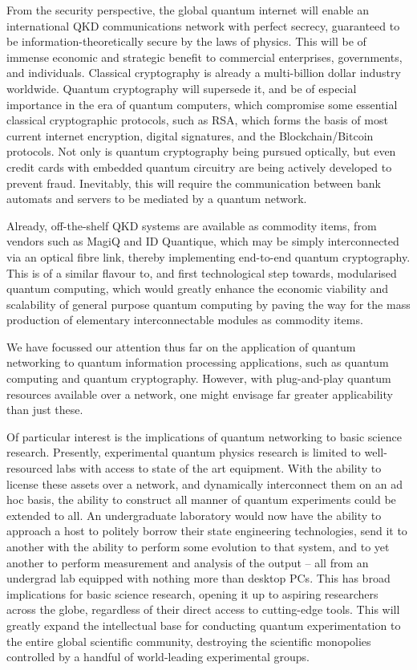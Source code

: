 \documentclass[aps, rmp, twocolumn, amsmath, amssymb, nofootinbib, superscriptaddress, longbibliography, floatfix, table-of-contents, eqsecnum]{revtex4-1}
\begin{document}
From the security perspective, the global quantum internet will enable an international QKD communications network with perfect secrecy, guaranteed to be information-theoretically secure by the laws of physics. This will be of immense economic and strategic benefit to commercial enterprises, governments, and individuals. Classical cryptography is already a multi-billion dollar industry worldwide. Quantum cryptography will supersede it, and be of especial importance in the era of quantum computers, which compromise some essential classical cryptographic protocols, such as RSA, which forms the basis of most current internet encryption, digital signatures, and the Blockchain/Bitcoin protocols. Not only is quantum cryptography being pursued optically, but even credit cards with embedded quantum circuitry are being actively developed to prevent fraud. Inevitably, this will require the communication between bank automats and servers to be mediated by a quantum network.

Already, off-the-shelf QKD systems are available as commodity items, from vendors such as MagiQ and ID Quantique, which may be simply interconnected via an optical fibre link, thereby implementing end-to-end quantum cryptography. This is of a similar flavour to, and first technological step towards, modularised quantum computing, which would greatly enhance the economic viability and scalability of general purpose quantum computing by paving the way for the mass production of elementary interconnectable modules as commodity items.

We have focussed our attention thus far on the application of quantum networking to quantum information processing applications, such as quantum computing and quantum cryptography. However, with plug-and-play quantum resources available over a network, one might envisage far greater applicability than just these.

Of particular interest is the implications of quantum networking to basic science research. Presently, experimental quantum physics research is limited to well-resourced labs with access to state of the art equipment. With the ability to license these assets over a network, and dynamically interconnect them on an ad hoc basis, the ability to construct all manner of quantum experiments could be extended to all. An undergraduate laboratory would now have the ability to approach a host to politely borrow their state engineering technologies, send it to another with the ability to perform some evolution to that system, and to yet another to perform measurement and analysis of the output -- all from an undergrad lab equipped with nothing more than desktop PCs. This has broad implications for basic science research, opening it up to aspiring researchers across the globe, regardless of their direct access to cutting-edge tools. This will greatly expand the intellectual base for conducting quantum experimentation to the entire global scientific community, destroying the scientific monopolies controlled by a handful of world-leading experimental groups.
\end{document}
